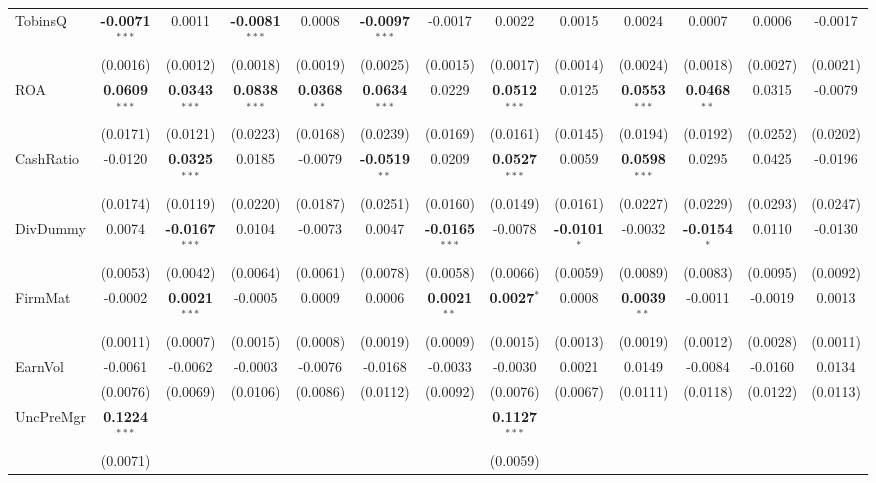 \begin{landscape}
\begin{table}[H]
\begin{tabular}{lcccccccccccc}
TobinsQ & \textbf{-0.0071}$^{***}$ & 0.0011 & \textbf{-0.0081}$^{***}$ & 0.0008 & \textbf{-0.0097}$^{***}$ & -0.0017 & 0.0022 & 0.0015 & 0.0024 & 0.0007 & 0.0006 & -0.0017 \\
 & (0.0016) & (0.0012) & (0.0018) & (0.0019) & (0.0025) & (0.0015) & (0.0017) & (0.0014) & (0.0024) & (0.0018) & (0.0027) & (0.0021) \\
ROA & \textbf{0.0609}$^{***}$ & \textbf{0.0343}$^{***}$ & \textbf{0.0838}$^{***}$ & \textbf{0.0368}$^{**}$ & \textbf{0.0634}$^{***}$ & 0.0229 & \textbf{0.0512}$^{***}$ & 0.0125 & \textbf{0.0553}$^{***}$ & \textbf{0.0468}$^{**}$ & 0.0315 & -0.0079 \\
 & (0.0171) & (0.0121) & (0.0223) & (0.0168) & (0.0239) & (0.0169) & (0.0161) & (0.0145) & (0.0194) & (0.0192) & (0.0252) & (0.0202) \\
CashRatio & -0.0120 & \textbf{0.0325}$^{***}$ & 0.0185 & -0.0079 & \textbf{-0.0519}$^{**}$ & 0.0209 & \textbf{0.0527}$^{***}$ & 0.0059 & \textbf{0.0598}$^{***}$ & 0.0295 & 0.0425 & -0.0196 \\
 & (0.0174) & (0.0119) & (0.0220) & (0.0187) & (0.0251) & (0.0160) & (0.0149) & (0.0161) & (0.0227) & (0.0229) & (0.0293) & (0.0247) \\
DivDummy & 0.0074 & \textbf{-0.0167}$^{***}$ & 0.0104 & -0.0073 & 0.0047 & \textbf{-0.0165}$^{***}$ & -0.0078 & \textbf{-0.0101}$^{*}$ & -0.0032 & \textbf{-0.0154}$^{*}$ & 0.0110 & -0.0130 \\
 & (0.0053) & (0.0042) & (0.0064) & (0.0061) & (0.0078) & (0.0058) & (0.0066) & (0.0059) & (0.0089) & (0.0083) & (0.0095) & (0.0092) \\
FirmMat & -0.0002 & \textbf{0.0021}$^{***}$ & -0.0005 & 0.0009 & 0.0006 & \textbf{0.0021}$^{**}$ & \textbf{0.0027}$^{*}$ & 0.0008 & \textbf{0.0039}$^{**}$ & -0.0011 & -0.0019 & 0.0013 \\
 & (0.0011) & (0.0007) & (0.0015) & (0.0008) & (0.0019) & (0.0009) & (0.0015) & (0.0013) & (0.0019) & (0.0012) & (0.0028) & (0.0011) \\
EarnVol & -0.0061 & -0.0062 & -0.0003 & -0.0076 & -0.0168 & -0.0033 & -0.0030 & 0.0021 & 0.0149 & -0.0084 & -0.0160 & 0.0134 \\
 & (0.0076) & (0.0069) & (0.0106) & (0.0086) & (0.0112) & (0.0092) & (0.0076) & (0.0067) & (0.0111) & (0.0118) & (0.0122) & (0.0113) \\
UncPreMgr & \textbf{0.1224}$^{***}$ &  &  &  &  &  & \textbf{0.1127}$^{***}$ &  &  &  &  &  \\
 & (0.0071) &  &  &  &  &  & (0.0059) &  &  &  &  &  \\

\end{tabular}
\end{table}
\end{landscape}
